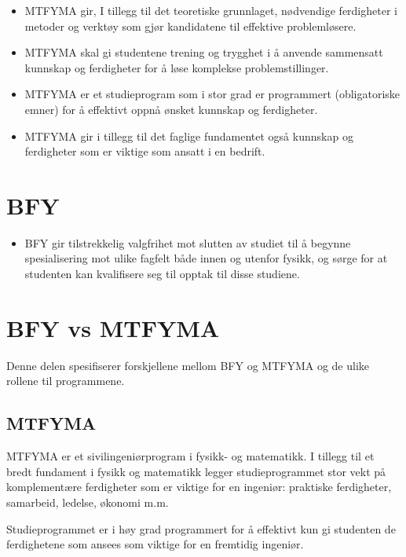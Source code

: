 \begin{itemize}
	\item MTFYMA gir, I tillegg til det teoretiske grunnlaget, nødvendige ferdigheter i metoder og verktøy som gjør kandidatene til effektive problemløsere.
	\item MTFYMA skal gi studentene trening og trygghet i å anvende sammensatt kunnskap og ferdigheter for å løse komplekse problemstillinger.
	\item MTFYMA er et studieprogram som i stor grad er programmert (obligatoriske emner) for å effektivt oppnå ønsket kunnskap og ferdigheter.
	\item MTFYMA gir i tillegg til det faglige fundamentet også kunnskap og ferdigheter som er viktige som ansatt i en bedrift.
\end{itemize}

\section{BFY}
\begin{itemize}
	\item BFY gir tilstrekkelig valgfrihet mot slutten av studiet til å begynne spesialisering mot ulike fagfelt både innen og utenfor fysikk, og sørge for at studenten kan kvalifisere seg til opptak til disse studiene.
\end{itemize}

\section{BFY vs MTFYMA}

Denne delen spesifiserer forskjellene mellom BFY og MTFYMA og de ulike rollene til programmene.

\subsection{MTFYMA}
MTFYMA er et sivilingeniørprogram i fysikk- og matematikk. I tillegg til et bredt fundament i fysikk og matematikk legger studieprogrammet stor vekt på komplementære ferdigheter som er viktige for en ingeniør: praktiske ferdigheter, samarbeid, ledelse, økonomi m.m.  

Studieprogrammet er i høy grad programmert for å effektivt kun gi studenten de ferdighetene som ansees som viktige for en fremtidig ingeniør.

